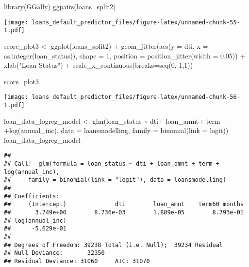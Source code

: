 \documentclass[
]{article}
\newenvironment{Shaded}{\begin{snugshade}}{\end{snugshade}}
\newcommand{\AttributeTok}[1]{\textcolor[rgb]{0.77,0.63,0.00}{#1}}
\newcommand{\DecValTok}[1]{\textcolor[rgb]{0.00,0.00,0.81}{#1}}
\newcommand{\FloatTok}[1]{\textcolor[rgb]{0.00,0.00,0.81}{#1}}
\newcommand{\FunctionTok}[1]{\textcolor[rgb]{0.00,0.00,0.00}{#1}}
\newcommand{\NormalTok}[1]{#1}
\newcommand{\OtherTok}[1]{\textcolor[rgb]{0.56,0.35,0.01}{#1}}
\newcommand{\SpecialCharTok}[1]{\textcolor[rgb]{0.00,0.00,0.00}{#1}}
\newcommand{\StringTok}[1]{\textcolor[rgb]{0.31,0.60,0.02}{#1}}
\begin{document}
\begin{Shaded}
\begin{Highlighting}[]
\FunctionTok{library}\NormalTok{(GGally)}
\FunctionTok{ggpairs}\NormalTok{(loans\_split2)}
\end{Highlighting}
\end{Shaded}

\texttt{[image: loans\_default\_predictor\_files/figure-latex/unnamed-chunk-55-1.pdf]}

\begin{Shaded}
\begin{Highlighting}[]
\NormalTok{score\_plot3 }\OtherTok{\textless{}{-}} \FunctionTok{ggplot}\NormalTok{(loans\_split2) }\SpecialCharTok{+}
  \FunctionTok{geom\_jitter}\NormalTok{(}\FunctionTok{aes}\NormalTok{(}\AttributeTok{y =}\NormalTok{ dti, }\AttributeTok{x =} \FunctionTok{as.integer}\NormalTok{(loan\_status)), }\AttributeTok{shape =} \DecValTok{1}\NormalTok{, }
              \AttributeTok{position =} \FunctionTok{position\_jitter}\NormalTok{(}\AttributeTok{width =} \FloatTok{0.05}\NormalTok{)) }\SpecialCharTok{+} 
  \FunctionTok{xlab}\NormalTok{(}\StringTok{"Loan Status"}\NormalTok{) }\SpecialCharTok{+} \FunctionTok{scale\_x\_continuous}\NormalTok{(}\AttributeTok{breaks=}\FunctionTok{seq}\NormalTok{(}\DecValTok{0}\NormalTok{, }\DecValTok{1}\NormalTok{,}\DecValTok{1}\NormalTok{))}

\NormalTok{score\_plot3}
\end{Highlighting}
\end{Shaded}

\texttt{[image: loans\_default\_predictor\_files/figure-latex/unnamed-chunk-56-1.pdf]}

\begin{Shaded}
\begin{Highlighting}[]
\NormalTok{loan\_data\_logreg\_model }\OtherTok{\textless{}{-}} \FunctionTok{glm}\NormalTok{(loan\_status }\SpecialCharTok{\textasciitilde{}}\NormalTok{ dti}\SpecialCharTok{+}\NormalTok{ loan\_amnt}\SpecialCharTok{+}\NormalTok{ term }\SpecialCharTok{+}\FunctionTok{log}\NormalTok{(annual\_inc), }\AttributeTok{data =}\NormalTok{ loansmodelling, }\AttributeTok{family =} \FunctionTok{binomial}\NormalTok{(}\AttributeTok{link =} \StringTok{\textquotesingle{}logit\textquotesingle{}}\NormalTok{))}
\NormalTok{loan\_data\_logreg\_model}
\end{Highlighting}
\end{Shaded}

\begin{verbatim}
## 
## Call:  glm(formula = loan_status ~ dti + loan_amnt + term + log(annual_inc), 
##     family = binomial(link = "logit"), data = loansmodelling)
## 
## Coefficients:
##     (Intercept)              dti        loan_amnt    term60 months  
##       3.749e+00        8.736e-03        1.889e-05        8.793e-01  
## log(annual_inc)  
##      -5.629e-01  
## 
## Degrees of Freedom: 39238 Total (i.e. Null);  39234 Residual
## Null Deviance:       32350 
## Residual Deviance: 31060     AIC: 31070
\end{verbatim}
\end{document}
